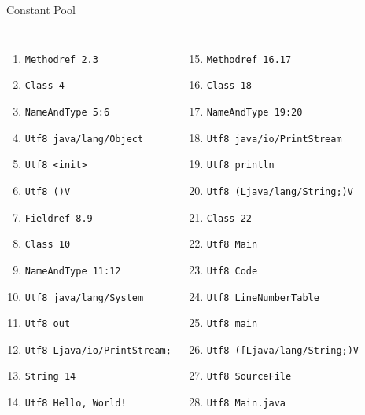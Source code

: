 \documentclass[14pt, aspectratio=169]{beamer}
\begin{document}
\begin{frame}{Constant Pool}

\tiny
\begin{columns}
\begin{enumerate}
   \item \texttt{Methodref          2.3}
   \item \texttt{Class              4}
   \item \texttt{NameAndType        5:6}
   \item \texttt{Utf8               java/lang/Object}
   \item \texttt{Utf8               <init>}
   \item \texttt{Utf8               ()V}
   \item \texttt{Fieldref           8.9}
   \item \texttt{Class              10}
   \item \texttt{NameAndType        11:12}
   \item \texttt{Utf8               java/lang/System}
   \item \texttt{Utf8               out}
   \item \texttt{Utf8               Ljava/io/PrintStream;}
   \item \texttt{String             14}
   \item \texttt{Utf8               Hello, World!}
\end{enumerate}
\begin{enumerate}
    \setcounter{enumi}{14}
   \item \texttt{Methodref          16.17}
   \item \texttt{Class              18}
   \item \texttt{NameAndType        19:20}
   \item \texttt{Utf8               java/io/PrintStream}
   \item \texttt{Utf8               println}
   \item \texttt{Utf8               (Ljava/lang/String;)V}
   \item \texttt{Class              22}
   \item \texttt{Utf8               Main}
   \item \texttt{Utf8               Code}
   \item \texttt{Utf8               LineNumberTable}
   \item \texttt{Utf8               main}
   \item \texttt{Utf8               ([Ljava/lang/String;)V}
   \item \texttt{Utf8               SourceFile}
   \item \texttt{Utf8               Main.java}
\end{enumerate}
\end{columns}
\end{frame}
\end{document}
